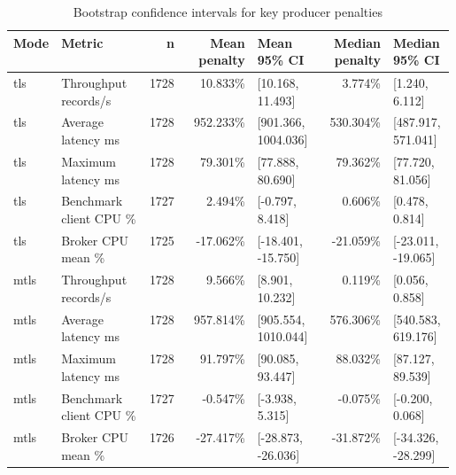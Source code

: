 \begin{table}[H]
\centering
\setlength{\tabcolsep}{4pt}
\renewcommand{\arraystretch}{1.15}
\begin{tabular}{|p{0.10\linewidth}|p{0.20\linewidth}|r|r|p{0.14\linewidth}|r|p{0.14\linewidth}|}
\hline
\textbf{Mode} & \textbf{Metric} & \textbf{n} & \textbf{Mean penalty} & \textbf{Mean 95\% CI} & \textbf{Median penalty} & \textbf{Median 95\% CI} \\
\hline
tls & Throughput records/s & 1728 & 10.833\% & [10.168, 11.493] & 3.774\% & [1.240, 6.112] \\
tls & Average latency ms & 1728 & 952.233\% & [901.366, 1004.036] & 530.304\% & [487.917, 571.041] \\
tls & Maximum latency ms & 1728 & 79.301\% & [77.888, 80.690] & 79.362\% & [77.720, 81.056] \\
tls & Benchmark client CPU \% & 1727 & 2.494\% & [-0.797, 8.418] & 0.606\% & [0.478, 0.814] \\
tls & Broker CPU mean \% & 1725 & -17.062\% & [-18.401, -15.750] & -21.059\% & [-23.011, -19.065] \\
mtls & Throughput records/s & 1728 & 9.566\% & [8.901, 10.232] & 0.119\% & [0.056, 0.858] \\
mtls & Average latency ms & 1728 & 957.814\% & [905.554, 1010.044] & 576.306\% & [540.583, 619.176] \\
mtls & Maximum latency ms & 1728 & 91.797\% & [90.085, 93.447] & 88.032\% & [87.127, 89.539] \\
mtls & Benchmark client CPU \% & 1727 & -0.547\% & [-3.938, 5.315] & -0.075\% & [-0.200, 0.068] \\
mtls & Broker CPU mean \% & 1726 & -27.417\% & [-28.873, -26.036] & -31.872\% & [-34.326, -28.299] \\
\hline
\end{tabular}
\caption{Bootstrap confidence intervals for key producer penalties}
\label{tab:producer-bootstrap-ci}
\end{table}

